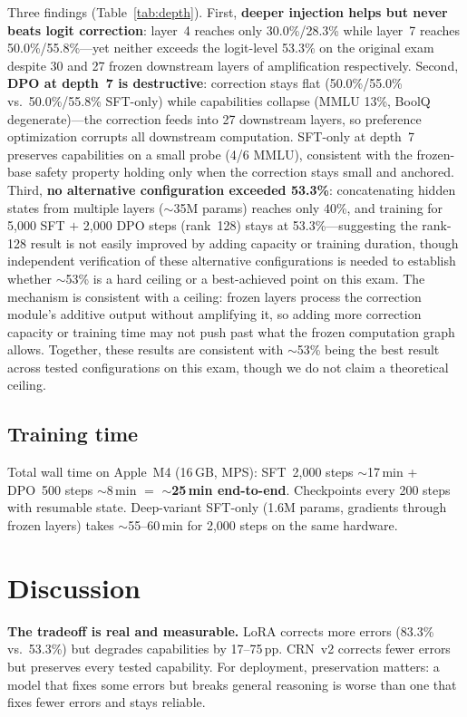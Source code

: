 \documentclass[11pt]{article}
\begin{document}
Three findings (Table~\ref{tab:depth}).
First, \textbf{deeper injection helps but never beats logit correction}: layer~4 reaches only 30.0\%/28.3\% while layer~7 reaches 50.0\%/55.8\%---yet neither exceeds the logit-level 53.3\% on the original exam despite 30 and 27 frozen downstream layers of amplification respectively.
Second, \textbf{DPO at depth~7 is destructive}: correction stays flat (50.0\%/55.0\% vs.\ 50.0\%/55.8\% SFT-only) while capabilities collapse (MMLU 13\%, BoolQ degenerate)---the correction feeds into 27 downstream layers, so preference optimization corrupts all downstream computation.
SFT-only at depth~7 preserves capabilities on a small probe (4/6 MMLU), consistent with the frozen-base safety property holding only when the correction stays small and anchored.
Third, \textbf{no alternative configuration exceeded 53.3\%}: concatenating hidden states from multiple layers ($\sim$35M params) reaches only 40\%, and training for 5{,}000 SFT $+$ 2{,}000 DPO steps (rank~128) stays at 53.3\%---suggesting the rank-128 result is not easily improved by adding capacity or training duration, though independent verification of these alternative configurations is needed to establish whether $\sim$53\% is a hard ceiling or a best-achieved point on this exam.
The mechanism is consistent with a ceiling: frozen layers process the correction module's additive output without amplifying it, so adding more correction capacity or training time may not push past what the frozen computation graph allows.
Together, these results are consistent with $\sim$53\% being the best result across tested configurations on this exam, though we do not claim a theoretical ceiling.

\subsection{Training time}

Total wall time on Apple~M4 (16\,GB, MPS): SFT~2{,}000 steps $\sim$17\,min + DPO~500 steps $\sim$8\,min $=$ \textbf{$\sim$25\,min end-to-end}.
Checkpoints every 200 steps with resumable state.
Deep-variant SFT-only (1.6M params, gradients through frozen layers) takes $\sim$55--60\,min for 2{,}000 steps on the same hardware.

\section{Discussion}

\textbf{The tradeoff is real and measurable.}
LoRA corrects more errors (83.3\% vs.\ 53.3\%) but degrades capabilities by 17--75\,pp.
CRN~v2 corrects fewer errors but preserves every tested capability.
For deployment, preservation matters: a model that fixes some errors but breaks general reasoning is worse than one that fixes fewer errors and stays reliable.
\end{document}
